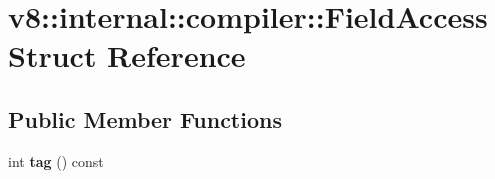 \hypertarget{structv8_1_1internal_1_1compiler_1_1_field_access}{}\section{v8\+:\+:internal\+:\+:compiler\+:\+:Field\+Access Struct Reference}
\label{structv8_1_1internal_1_1compiler_1_1_field_access}
\subsection*{Public Member Functions}
\begin{DoxyCompactItemize}
\item 
int {\bfseries tag} () const \hypertarget{structv8_1_1internal_1_1compiler_1_1_field_access_a45766bd5caa21f38dada621e3bc233cf}{}\label{structv8_1_1internal_1_1compiler_1_1_field_access_a45766bd5caa21f38dada621e3bc233cf}

\end{DoxyCompactItemize}
